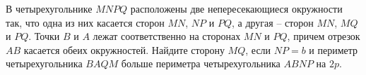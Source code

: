 \begin{ex}
	\begin{condition}
		В четырехугольнике \( MNPQ  \) расположены две непересекающиеся окружности так, что одна из них касается сторон \( MN  \), \( NP  \) и \( PQ \), а другая – сторон \( MN  \), \( MQ  \) и \( PQ \). Точки \( B \) и \( A  \) лежат соответственно на сторонах \( MN  \) и \( PQ \), причем отрезок \( AB  \) касается обеих окружностей. Найдите сторону \( MQ \), если \( NP = b  \) и периметр четырехугольника \( BAQM  \) больше периметра четырехугольника \( ABNP  \) на \( 2p \).
	\end{condition}
\end{ex}